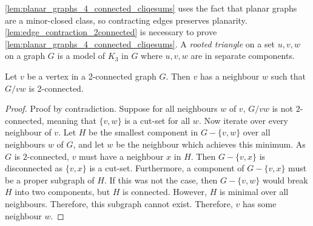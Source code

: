 \cref{lem:planar_graphs_4_connected_cliqesums} uses the fact that planar graphs are a minor-closed class, so contracting edges preserves planarity. \cref{lem:edge_contraction_2connected} is necessary to prove \cref{lem:planar_graphs_4_connected_cliqesums}. A \textit{rooted triangle} on a set $u, v, w$ on a graph $G$ is a model of $K_3$ in $G$ where $u, v, w$ are in separate components. 

\begin{lemma}\label{lem:edge_contraction_2connected}
	Let $v$ be a vertex in a 2-connected graph $G$. Then $v$ has a neighbour $w$ such that $G/vw$ is 2-connected.
\end{lemma}
\begin{proof}
	Proof by contradiction. Suppose for all neighbours $w$ of $v$, $G/vw$ is not $2$-connected, meaning that $\{v,w\}$ is a cut-set for all $w$. Now iterate over every neighbour of $v$. Let $H$ be the smallest component in $G - \{v,w\}$ over all neighbours $w$ of $G$, and let $w$ be the neighbour which achieves this minimum. As $G$ is $2$-connected, $v$ must have a neighbour $x$ in $H$. Then $G - \{v, x\}$ is disconnected as $\{v,x\}$ is a cut-set. Furthermore, a component of $G - \{v,x\}$ must be a proper subgraph of $H$. If this was not the case, then $G - \{v,w\}$ would break $H$ into two components, but $H$ is connected. However, $H$ is minimal over all neighbours. Therefore, this subgraph cannot exist. Therefore, $v$ has some neighbour $w$. 
\end{proof}

